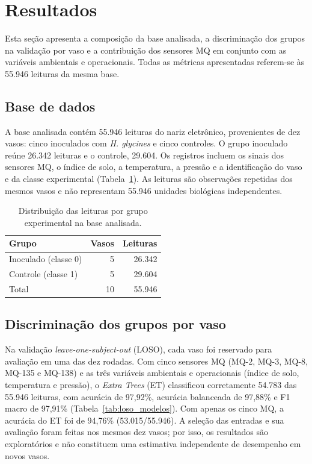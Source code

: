 \section{Resultados}
\label{results}

Esta seção apresenta a composição da base analisada, a discriminação dos
grupos na validação por vaso e a contribuição dos sensores MQ em conjunto
com as variáveis ambientais e operacionais. Todas as métricas apresentadas
referem-se às 55.946 leituras da mesma base.

\subsection{Base de dados}
\label{subsec:res_base}

A base analisada contém 55.946 leituras do nariz eletrônico, provenientes
de dez vasos: cinco inoculados com \textit{H. glycines} e cinco controles.
O grupo inoculado reúne 26.342 leituras e o controle, 29.604. Os registros
incluem os sinais dos sensores MQ, o índice de solo, a temperatura, a
pressão e a identificação do vaso e da classe experimental
(Tabela~\ref{tab:base_dados}). As leituras são observações repetidas dos
mesmos vasos e não representam 55.946 unidades biológicas independentes.

\begin{table}[H]
\centering
\footnotesize
\caption{Distribuição das leituras por grupo experimental na base analisada.}
\label{tab:base_dados}
\begin{tabular}{lrr}
\toprule
Grupo & Vasos & Leituras \\
\midrule
Inoculado (classe 0) & 5 & 26.342 \\
Controle (classe 1) & 5 & 29.604 \\
\midrule
Total & 10 & 55.946 \\
\bottomrule
\end{tabular}
\end{table}

\subsection{Discriminação dos grupos por vaso}
\label{subsec:res_loso}

Na validação \textit{leave-one-subject-out} (LOSO), cada vaso foi reservado
para avaliação em uma das dez rodadas. Com cinco sensores MQ (MQ-2, MQ-3,
MQ-8, MQ-135 e MQ-138) e as três variáveis ambientais e operacionais
(índice de solo, temperatura e pressão), o \textit{Extra Trees} (ET)
classificou corretamente 54.783 das 55.946 leituras, com acurácia de
97,92\%, acurácia balanceada de 97,88\% e F1 macro de 97,91\%
(Tabela~\ref{tab:loso_modelos}). Com apenas os cinco MQ, a acurácia do ET
foi de 94,76\% (53.015/55.946). A seleção das entradas e sua avaliação
foram feitas nos mesmos dez vasos; por isso, os resultados são
exploratórios e não constituem uma estimativa independente de desempenho
em novos vasos.

